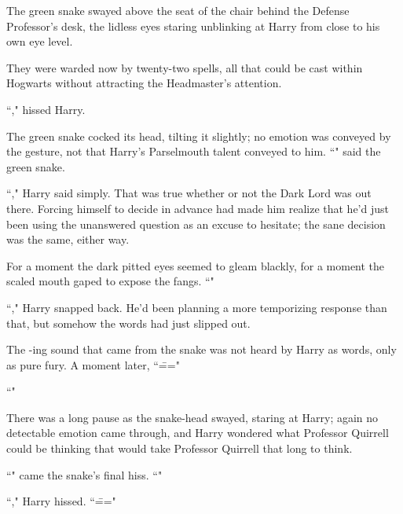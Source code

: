 The green snake swayed above the seat of the chair behind the Defense Professor's desk, the lidless eyes staring unblinking at Harry from close to his own eye level.

They were warded now by twenty-two spells, all that could be cast within Hogwarts without attracting the Headmaster's attention.

``," hissed Harry.

The green snake cocked its head, tilting it slightly; no emotion was conveyed by the gesture, not that Harry's Parselmouth talent conveyed to him. ``" said the green snake.

``," Harry said simply. That was true whether or not the Dark Lord was out there. Forcing himself to decide in advance had made him realize that he'd just been using the unanswered question as an excuse to hesitate; the sane decision was the same, either way.

For a moment the dark pitted eyes seemed to gleam blackly, for a moment the scaled mouth gaped to expose the fangs. ``"

``," Harry snapped back. He'd been planning a more temporizing response than that, but somehow the words had just slipped out.

The -ing sound that came from the snake was not heard by Harry as words, only as pure fury. A moment later, ``\==="

``"

There was a long pause as the snake-head swayed, staring at Harry; again no detectable emotion came through, and Harry wondered what Professor Quirrell could be thinking that would take Professor Quirrell that long to think.

``" came the snake's final hiss. ``"

``," Harry hissed. ``\==="

